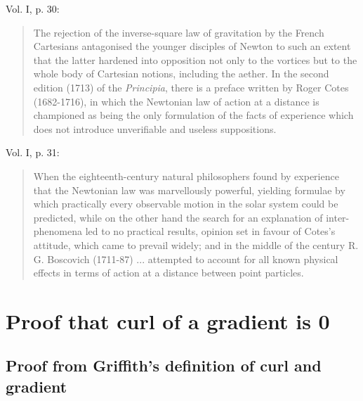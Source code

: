 \documentclass[a4paper]{article}
\theoremstyle{plain}
\theoremstyle{definition}
\begin{document}
Vol. I, p. 30:

\begin{quote}
  The rejection of the inverse-square law of gravitation by the French
  Cartesians antagonised the younger disciples of Newton to such an
  extent that the latter hardened into opposition not only to the
  vortices but to the whole body of Cartesian notions, including the
  aether.  In the second edition (1713) of the {\em Principia}, there
  is a preface written by Roger Cotes (1682-1716), in which the
  Newtonian law of action at a distance is championed as being the
  only formulation of the facts of experience which does not introduce
  unverifiable and useless suppositions.
\end{quote}

Vol. I, p. 31:

\begin{quote}
  When the eighteenth-century natural philosophers found by experience
  that the Newtonian law was marvellously powerful, yielding formulae
  by which practically every observable motion in the solar system
  could be predicted, while on the other hand the search for an
  explanation of inter-phenomena led to no practical results, opinion
  set in favour of Cotes's attitude, which came to prevail widely; and
  in the middle of the century R. G. Boscovich (1711-87) ... attempted
  to account for all known physical effects in terms of action at a
  distance between point particles.
\end{quote}



\appendix

\section{Proof that curl of a gradient is 0}
\label{sec:curlofgradis0}

\subsection{Proof from Griffith's definition of curl and gradient}
\end{document}
